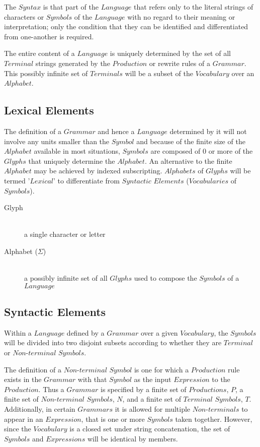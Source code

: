 \documentclass{article}
\begin{document}
The $Syntax$ is that part of the $Language$ that refers only to the
literal strings of characters or $Symbols$ of the $Language$ with no
regard to their meaning or interpretation; only the condition that
they can be identified and differentiated from one-another is
required.

The entire content of a $Language$ is uniquely determined by the set
of all $Terminal$ strings generated by the $Production$ or rewrite
rules of a $Grammar$. This possibly infinite set of $Terminals$ will
be a subset of the $Vocabulary$ over an $Alphabet$.

\subsection{Lexical Elements}

The definition of a $Grammar$ and hence a $Language$ determined by it
will not involve any units smaller than the $Symbol$ and because of
the finite size of the $Alphabet$ available in most situations,
$Symbols$ are composed of 0 or more of the $Glyphs$ that uniquely
determine the $Alphabet$. An alternative to the finite $Alphabet$ may
be achieved by indexed subscripting. $Alphabets$ of $Glyphs$ will be
termed '$Lexical$' to differentiate from $Syntactic$ $Elements$
($Vocabularies$ of $Symbols$).

    \begin{description}

    \item[Glyph] \hfill \\
    a single character or letter

    \item[Alphabet ($\Sigma$)] \hfill \\
    a possibly infinite set of all $Glyphs$ used to compose the
    $Symbols$ of a $Language$

    \end{description}

\subsection{Syntactic Elements}

Within a $Language$ defined by a $Grammar$ over a given $Vocabulary$,
the $Symbols$ will be divided into two disjoint subsets according to
whether they are $Terminal$ or $Non$-$terminal$ $Symbols$.

The definition of a $Non$-$terminal$ $Symbol$ is one for which a
$Production$ rule exists in the $Grammar$ with that $Symbol$ as the
input $Expression$ to the $Production$. Thus a $Grammar$ is specified
by a finite set of $Productions$, $P$, a finite set of $Non$-$terminal$
$Symbols$, $N$, and a finite set of $Terminal$ $Symbols$,
$T$. Additionally, in certain $Grammars$ it is allowed for multiple
$Non$-$terminals$ to appear in an $Expression$, that is one or more
$Symbols$ taken together. However, since the $Vocabulary$ is a closed
set under string concatenation, the set of $Symbols$ and $Expressions$
will be identical by members.
\end{document}
